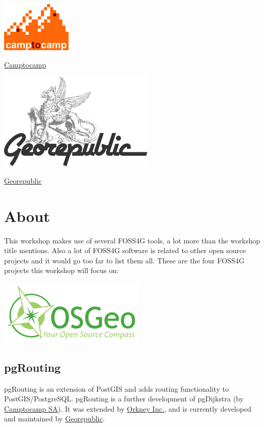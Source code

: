 \documentclass[a4paper,10pt,english]{manual}
\begin{document}
\includegraphics{camptocamp.png}

\href{http://www.camptocamp.com}{Camptocamp}

\includegraphics{georepublic.png}

\href{http://georepublic.de}{Georepublic}

\resetcurrentobjects
\hypertarget{--doc-chapters/about}{}

\chapter{About}

This workshop makes use of several FOSS4G tools, a lot more than the workshop title mentions. Also a lot of FOSS4G software is related to other open source projects and it would go too far to list them all. These are the four FOSS4G projects this workshop will focus on:

{\hfill\includegraphics{osgeo.png}\hfill}


\section{pgRouting}

pgRouting is an extension of PostGIS and adds routing functionality to PostGIS/PostgreSQL. pgRouting is a further development of pgDijkstra (by \href{http://www.camptocamp.com}{Camptocamp SA}). It was extended by \href{http://www.orkney.co.jp}{Orkney Inc.}, and is currently developed and maintained by \href{http://georepublic.de}{Georepublic}.
\end{document}
